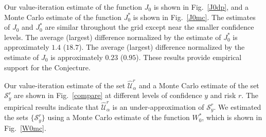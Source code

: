 \documentclass[letterpaper, 10 pt, conference]{ieeeconf}  %
\begin{document}
Our value-iteration estimate of the function $J_0$ is shown in Fig.~\ref{J0dp}, and a Monte Carlo estimate of the function $J_0^*$ is shown in Fig.~\ref{J0mc}.
The estimates of $J_0$ and $J_0^*$ are similar throughout the grid except near the smaller confidence levels.
The average (largest) difference normalized by the estimate of $J_0^*$  is approximately $1.4$ ($18.7$).
The average (largest) difference normalized by the estimate of $J_0$  is approximately $0.23$ ($0.95$).
These results provide empirical support for the Conjecture.
 
Our value-iteration estimate of the set $\widehat{\mathcal{U}}_{\alpha}^r$ and a Monte Carlo estimate of the set $\mathcal{S}_y^r$ are shown in Fig.~\ref{compare} at different levels of confidence $y$ and risk $r$. 
The empirical results indicate that $\widehat{\mathcal{U}}_{\alpha}^r$ is an under-approximation of $\mathcal{S}_y^r$. We estimated the sets $\{\mathcal{S}_y^r\}$ using a Monte Carlo estimate of the function $W_0^*$, which is shown in Fig.~\ref{W0mc}.
\end{document}

